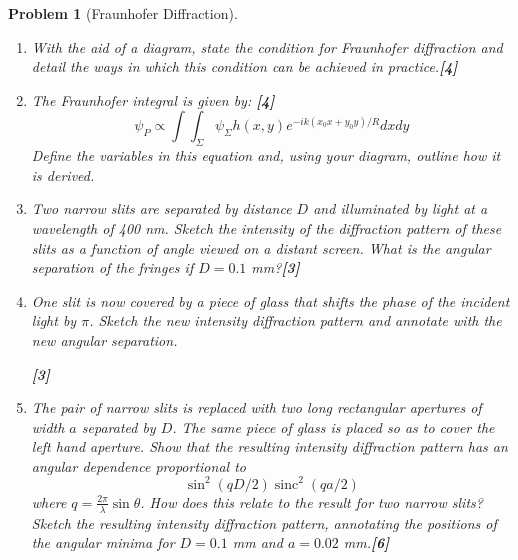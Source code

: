 \documentclass[a4paper]{article}
\DeclareMathOperator{\sinc}{sinc}
\theoremstyle{new}
\newtheorem{qns}{Problem}[subsection]
\begin{document}
\newpage
\begin{qns}[Fraunhofer Diffraction]\leavevmode
\begin{enumerate}[label=(\alph*)]
\item With the aid of a diagram, state the condition for Fraunhofer diffraction and detail the ways in which this condition can be achieved in practice.\hfill\textbf{[4]}
\item The Fraunhofer integral is given by: \hfill\textbf{[4]}
$$\psi_P\propto\int\int_\Sigma\psi_\Sigma h(x,y)e^{-ik(x_0x+y_0y)/R}dxdy$$
Define the variables in this equation and, using your diagram, outline how it is derived.
\item Two narrow slits are separated by distance $D$ and illuminated by light at a wavelength of 400 nm. Sketch the intensity of the diffraction pattern of these slits as a function of angle viewed on a distant screen. What is the angular separation of the fringes if $D = 0.1$ mm?\hfill\textbf{[3]}
\item One slit is now covered by a piece of glass that shifts the phase of the incident light by $\pi$. Sketch the new intensity diffraction pattern and annotate with the new angular separation.

\hfill\textbf{[3]}
\item The pair of narrow slits is replaced with two long rectangular apertures of width $a$ separated by $D$. The same piece of glass is placed so as to cover the left hand aperture. Show that the resulting intensity diffraction pattern has an angular dependence proportional to
$$\sin^2(qD/2)\sinc^2(qa/2)$$
where $q=\frac{2\pi}{\lambda}\sin\theta$. How does this relate to the result for two narrow slits?\\[5pt]
Sketch the resulting intensity diffraction pattern, annotating the positions of the angular minima for $D = 0.1$ mm and $a = 0.02$ mm.\hfill\textbf{[6]}
\end{enumerate}
\end{qns}
\end{document}
